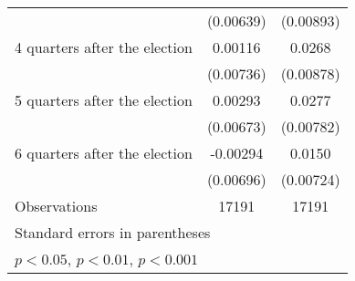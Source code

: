 \begin{table}[htbp]
\begin{tabular}{l*{2}{c}}
                    &   (0.00639)         &   (0.00893)         \\
[1em]
 4 quarters after the election&     0.00116         &      0.0268\sym{**} \\
                    &   (0.00736)         &   (0.00878)         \\
[1em]
 5 quarters after the election&     0.00293         &      0.0277\sym{***}\\
                    &   (0.00673)         &   (0.00782)         \\
[1em]
 6 quarters after the election&    -0.00294         &      0.0150\sym{*}  \\
                    &   (0.00696)         &   (0.00724)         \\
\hline
Observations        &       17191         &       17191         \\
\hline\hline
\multicolumn{3}{l}{\footnotesize Standard errors in parentheses}\\
\multicolumn{3}{l}{\footnotesize \sym{*} \(p<0.05\), \sym{**} \(p<0.01\), \sym{***} \(p<0.001\)}\\
\end{tabular}
\end{table}
